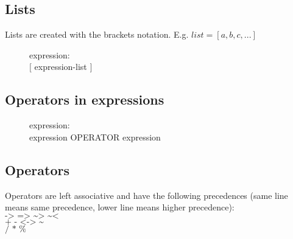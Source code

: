 \subsection{Lists}
Lists are created with the brackets notation. E.g. $list = [a, b, c, ...]$
\begin{description}
  \item[]expression: \hfill \\
    $[$ expression-list $]$
\end{description}

\subsection{Operators in expressions}
\begin{description}
  \item[]expression: \hfill \\
    expression OPERATOR expression
\end{description}

\subsection{Operators}
Operators are left associative and have the following precedences (same line
means same precedence, lower line means higher precedence):\\
$\texttt{-> => \textasciitilde> \textasciitilde<}$\\
$\texttt{+ - <-> \textasciitilde}$\\
$\texttt{/ * \%}$

